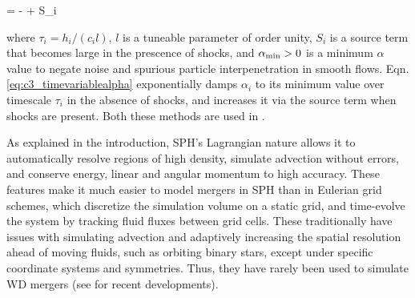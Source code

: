 \eqbegin
{} = - + S_i
\label{eq:c3_timevariablealpha}
\eqend

\noindent where $\tau_i = h_i/(c_i l)$, $l$ is a tuneable parameter of order unity, $S_i$ is a source term that becomes large in the prescence of shocks, and $\alpha_\mathrm{min} > 0$ is a minimum $\alpha$ value to negate noise and spurious particle interpenetration in smooth flows.  Eqn. \ref{eq:c3_timevariablealpha} exponentially damps $\alpha_i$ to its minimum value over timescale $\tau_i$ in the absence of shocks, and increases it via the source term when shocks are present.  Both these methods are used in \gasoline.


As explained in the introduction, SPH's Lagrangian nature allows it to automatically resolve regions of high density, simulate advection without errors, and conserve energy, linear and angular momentum to high accuracy.  These features make it much easier to model mergers in SPH than in Eulerian grid schemes, which discretize the simulation volume on a static grid, and time-evolve the system by tracking fluid fluxes between grid cells.  These traditionally have issues with simulating advection and adaptively increasing the spatial resolution ahead of moving fluids, such as orbiting binary stars, except under specific coordinate systems and symmetries.  Thus, they have rarely been used to simulate WD mergers (see \cite{katz+16} for recent developments).

